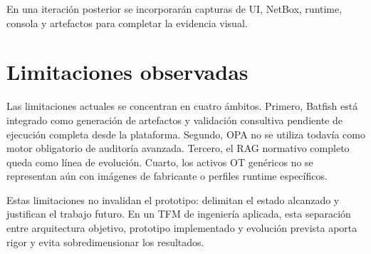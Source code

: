 En una iteración posterior se incorporarán capturas de UI, NetBox, runtime, consola y artefactos para completar la evidencia visual.

\section{Limitaciones observadas} \label{sec:limitaciones-observadas}

Las limitaciones actuales se concentran en cuatro ámbitos. Primero, Batfish está integrado como generación de artefactos y validación consultiva pendiente de ejecución completa desde la plataforma. Segundo, OPA no se utiliza todavía como motor obligatorio de auditoría avanzada. Tercero, el RAG normativo completo queda como línea de evolución. Cuarto, los activos OT genéricos no se representan aún con imágenes de fabricante o perfiles runtime específicos.

Estas limitaciones no invalidan el prototipo: delimitan el estado alcanzado y justifican el trabajo futuro. En un TFM de ingeniería aplicada, esta separación entre arquitectura objetivo, prototipo implementado y evolución prevista aporta rigor y evita sobredimensionar los resultados.
